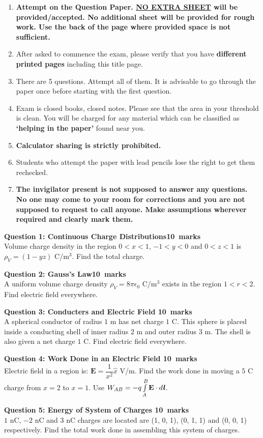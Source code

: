 \documentclass[12pt,a4paper]{article}
\def\QOne{10}
\def\Qtwo{10}
\def\Qthree{10}
\def\Qfour{10}
\def\Qfive{10}
\begin{document}
\begin{enumerate}
\item \textbf{Attempt on the Question Paper. \underline{NO EXTRA SHEET} will be provided/accepted. No
additional sheet will be provided for rough work. Use the back of the page where
provided space is not sufficient.}
\item After asked to commence the exam, please verify that you have \textbf{\pageref{LastPage} different
printed pages} including this title page.
\item There are 5 questions. Attempt all of them. It is advisable to go through the paper once
before starting with the first question.
\item Exam is closed books, closed notes. Please see that the area in your threshold is clean.
You will be charged for any material which can be classified as \textbf{`helping in the paper'}
found near you.
\item \textbf{Calculator sharing is strictly prohibited.}
\item Students who attempt the paper with lead pencils lose the right to get them rechecked.
\item \textbf{The invigilator present is not supposed to answer any questions. No one may come
to your room for corrections and you are not supposed to request to call anyone.
Make assumptions wherever required and clearly mark them.}
\end{enumerate}
\newpage
\noindent\textbf{Question 1: Continuous Charge Distributions\hfill \QOne~marks}\\
Volume charge density in the region $0<x<1$, $-1<y<0$ and $0<z<1$ is $\rho_V=(1-yz)$ C/m$^3$. Find the total charge.
\newpage

\noindent \textbf{Question 2: Gauss's Law\hfill \Qtwo~marks}\\
A uniform volume charge density $\rho_V=8\pi\epsilon_0$ C/m$^3$ exists in the region $1<r<2$. Find electric field everywhere.
\newpage

\noindent\textbf{Question 3: Conducters and Electric Field \hfill \Qthree~marks}\\
A spherical conductor of radius $1$ m has net charge $1$ C. This sphere is placed inside a conducting shell of inner radius $2$ m and outer radius $3$ m. The shell is also given a net charge $1$ C. Find electric field everywhere.
\newpage

\noindent\textbf{Question 4: Work Done in an Electric Field \hfill \Qfour~marks}\\
Electric field in a region is: $\textbf{E}=\dfrac{1}{x^2}\hat x$ V/m. Find the work done in moving a $5$ C charge from $x=2$ to $x=1$. Use $W_{AB}=-q\int\limits_{A}^{B} \textbf{E}\cdot d\textbf{\textit{l}}$.
\newpage

\noindent\textbf{Question 5: Energy of System of Charges \hfill \Qfive~marks}\\
$1$ nC, $-2$ nC and $3$ nC charges are located are (1, 0, 1), (0, 1, 1) and (0, 0, 1) respectively. Find the total work done in assembling this system of charges.
\end{document}
